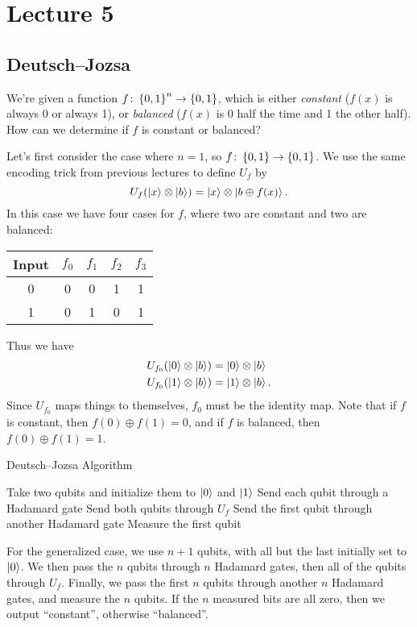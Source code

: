 \documentclass[class=article, crop=false]{standalone}
\begin{document}
  \section{Lecture 5}
  \subsection{Deutsch--Jozsa}
  We're given a function $f\colon \left\{0, 1\right\}^n\to \left\{0, 1\right\}$, which is either \emph{constant} ($f(x)$ is always 0 or always 1), or \emph{balanced} ($f(x)$ is 0 half the time and 1 the other half). How can we determine if $f$ is constant or balanced? \par
  Let's first consider the case where $n = 1$, so $f\colon \left\{0, 1\right\}\to \left\{0, 1\right\}$. We use the same encoding trick from previous lectures to define $U_f$ by
  \[
    U_f(\left\lvert x \right\rangle\otimes \left\lvert b \right\rangle) = \left\lvert x \right\rangle\otimes \left\lvert b\oplus f(x) \right\rangle.
  \]
  In this case we have four cases for $f$, where two are constant and two are balanced:
  \begin{center}
    \begin{tabular}{c|cccc}
      Input & $f_0$ & $f_1$ & $f_2$ & $f_3$ \\
      \hline
      0 & 0 & 0 & 1 & 1 \\
      1 & 0 & 1 & 0 & 1
    \end{tabular}
  \end{center}
  Thus we have
  \begin{align*}
    U_{f_0}(\left\lvert 0 \right\rangle\otimes \left\lvert b \right\rangle) &= \left\lvert 0 \right\rangle\otimes \left\lvert b \right\rangle \\
    U_{f_0}(\left\lvert 1 \right\rangle\otimes \left\lvert b \right\rangle) &= \left\lvert 1 \right\rangle\otimes \left\lvert b \right\rangle.
  \end{align*}
  Since $U_{f_0}$ maps things to themselves, $f_0$ must be the identity map. Note that if $f$ is constant, then $f(0)\oplus f(1) = 0$, and if $f$ is balanced, then $f(0)\oplus f(1) = 1$. \par
  \begin{algorithm}
    \DontPrintSemicolon
    \caption{Deutsch--Jozsa Algorithm}
    Take two qubits and initialize them to $\left\lvert 0 \right\rangle$ and $\left\lvert 1 \right\rangle$\;
    Send each qubit through a Hadamard gate\;
    Send both qubits through $U_f$\;
    Send the first qubit through another Hadamard gate\;
    Measure the first qubit\;
  \end{algorithm}
  For the generalized case, we use $n + 1$ qubits, with all but the last initially set to $\left\lvert 0 \right\rangle$. We then pass the $n$ qubits through $n$ Hadamard gates, then all of the qubits through $U_f$. Finally, we pass the first $n$ qubits through another $n$ Hadamard gates, and measure the $n$ qubits. If the $n$ measured bits are all zero, then we output ``constant'', otherwise ``balanced''.
\end{document}
